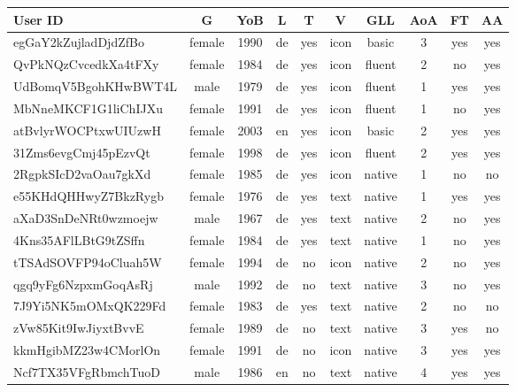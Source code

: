 \begin{table}[H]
\begin{tabular}{|l|c|c|c|c|c|c|c|c|c|}
\hline

\textbf{User ID} & \textbf{G} & \textbf{YoB} & \textbf{L} & \textbf{T} & \textbf{V} & \textbf{GLL} & \textbf{AoA} & \textbf{FT} & \textbf{AA} \\

\hline

egGaY2kZujladDjdZfBo & female & 1990 & de & yes & icon & basic & 3 & yes & yes \\ \hline

QvPkNQzCvcedkXa4tFXy & female & 1984 & de & yes & icon & fluent & 2 & no & yes \\ \hline

UdBomqV5BgohKHwBWT4L & male & 1979 & de & yes & icon & fluent & 1 & yes & yes \\ \hline

MbNneMKCF1G1liChIJXu & female & 1991 & de & yes & icon & fluent & 1 & no & yes \\ \hline

atBvlyrWOCPtxwUIUzwH & female & 2003 & en & yes & icon & basic & 2 & yes & yes \\ \hline

31Zms6evgCmj45pEzvQt & female & 1998 & de & yes & icon & fluent & 2 & yes & yes \\ \hline

2RgpkSIcD2vaOau7gkXd & female & 1985 & de & yes & icon & native & 1 & no & no \\ \hline

e55KHdQHHwyZ7BkzRygb & female & 1976 & de & yes & text & native & 1 & yes & yes \\ \hline

aXaD3SnDeNRt0wzmoejw & male & 1967 & de & yes & text & native & 2 & no & yes \\ \hline

4Kns35AFlLBtG9tZSffn & female & 1984 & de & yes & text & native & 1 & no & yes \\ \hline

tTSAdSOVFP94oCluah5W & female & 1994 & de & no & icon & native & 2 & no & yes \\ \hline

qgq9yFg6NzpxmGoqAsRj & male & 1992 & de & no & text & native & 3 & no & yes \\ \hline

7J9Yi5NK5mOMxQK229Fd & female & 1983 & de & yes & text & native & 2 & no & no \\ \hline

zVw85Kit9IwJiyxtBvvE & female & 1989 & de & no & text & native & 3 & yes & no \\ \hline

kkmHgibMZ23w4CMorlOn & female & 1991 & de & no & icon & native & 3 & yes & yes \\ \hline

Ncf7TX35VFgRbmchTuoD & male & 1986 & en & no & text & native & 4 & yes & yes \\ \hline
 
\end{tabular}
\end{table}

